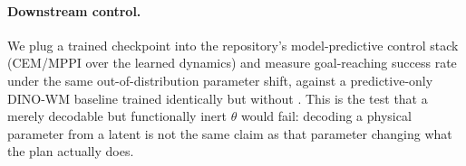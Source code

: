 \paragraph{Downstream control.} We plug a trained \method checkpoint
into the repository's model-predictive control stack (CEM/MPPI over
the learned dynamics) and measure goal-reaching success rate under the
same out-of-distribution parameter shift, against a predictive-only
DINO-WM baseline trained identically but without \pathB. This is the
test that a merely decodable but functionally inert $\theta$ would
fail: decoding a physical parameter from a latent is not the same
claim as that parameter changing what the plan actually does.
